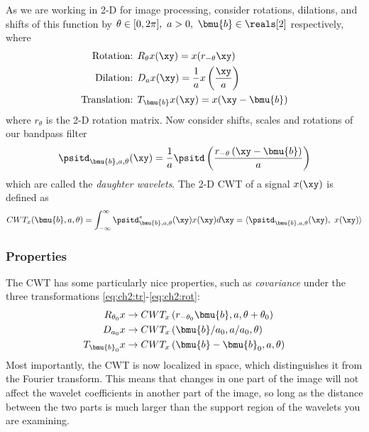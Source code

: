 As we are working in 2-D for image processing, consider rotations, dilations, and
shifts of this function by $\theta\in [0,2\pi],\ a>0,\ \bmu{b} \in \reals[2]$ respectively, where
\begin{align}
  \text{Rotation: } & R_{\theta}x(\xy) = x(r_{-\theta}\xy) \label{eq:ch2:rot}\\
  \text{Dilation: } & D_{a}x(\xy) = \frac{1}{a} x\left(\frac{\xy}{a}\right) \label{eq:ch2:di}\\
  \text{Translation: } & T_{\bmu{b}}x(\xy) = x(\xy - \bmu{b}) \label{eq:ch2:tr}
\end{align}
where $r_\theta$ is the 2-D rotation matrix. Now consider shifts, scales and
rotations of our bandpass filter
\begin{equation}
  \psitd_{\bmu{b},a, \theta}(\xy) = \frac{1}{a}\psitd \left(\frac{r_{-\theta}\left(\xy -
  \bmu{b}\right)}{a} \right) \label{eq:ch2:2d_shifts}
\end{equation}
which are called the \emph{daughter wavelets}. The 2-D CWT of a signal $x(\xy)$ is defined as
\begin{equation}
  CWT_x(\bmu{b}, a, \theta) = \int_{-\infty}^{\infty} \psitd^*_{\bmu{b}, a,
  \theta}(\xy) x(\xy) d\xy = \langle \psitd_{\bmu{b}, a, \theta}(\xy),\ x(\xy)
  \rangle \label{eq:ch2:cwt}
\end{equation}

\subsubsection{Properties}
The CWT has some particularly nice properties, such as \emph{covariance}
under the three transformations \eqref{eq:ch2:tr}-\eqref{eq:ch2:rot}:
\begin{align}
  R_{\theta_0}x & \rightarrow CWT_x\left(r_{-\theta_0}\bmu{b}, a, \theta + \theta_0 \right)  \\
  D_{a_0}x & \rightarrow CWT_x\left(\bmu{b}/a_0, a/a_0, \theta \right) \\
  T_{\bmu{b}_0}x & \rightarrow CWT_x\left(\bmu{b}-\bmu{b}_0, a, \theta \right)
\end{align}
Most importantly, the CWT is now localized in space, which distinguishes it from the
Fourier transform. This means that changes in one part of the image will not
affect the wavelet coefficients in another part of the image, so long as the
distance between the two parts is much larger than the support region of the
wavelets you are examining.

